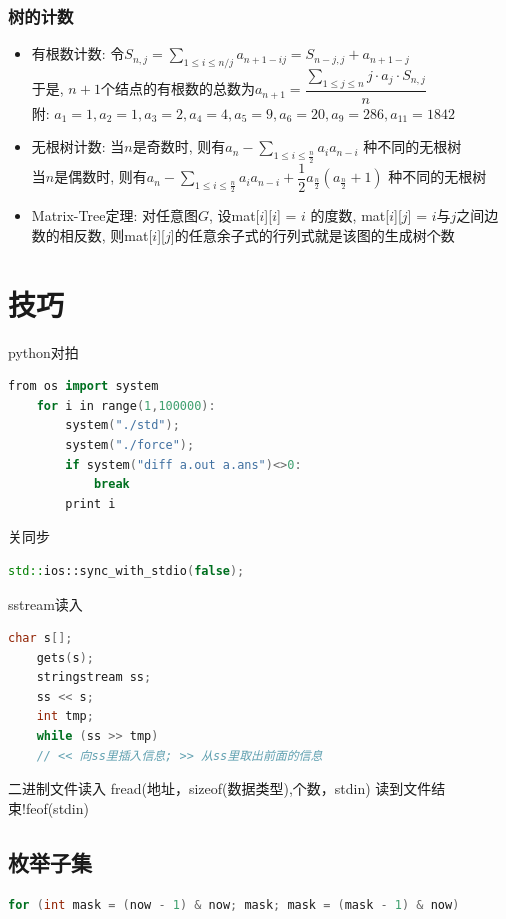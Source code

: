 \documentclass[landscape,a4paper]{article}
\begin{document}
\begin{spacing}{0.3}
\begin{multicols}{2}
\subsubsection{树的计数}
\begin{itemize}
\item 有根数计数: 令$S_{n, j} = \sum\limits_{1 \le i \le n / j} a_{n + 1 - ij} = S_{n - j, j} + a_{n + 1 - j}$\\
  于是, $n + 1$个结点的有根数的总数为$a_{n + 1} = \dfrac{\sum\limits_{1 \le j \le n} j \cdot a_j \cdot S_{n, j} }{n}$\\
  附: $a_1 = 1, a_2 = 1, a_3 = 2, a_4 = 4, a_5 = 9, a_6 = 20, a_9 = 286, a_{11} = 1842$
\item 无根树计数: 当$n$是奇数时, 则有$a_n - \sum\limits_{1 \le i \le \frac{n}{2}} a_i a_{n - i}$ 种不同的无根树\\
  当$n$是偶数时, 则有$a_n - \sum\limits_{1 \le i \le \frac{n}{2}} a_i a_{n - i} + \dfrac{1}{2} a_\frac{n}{2} (a_\frac{n}{2} + 1)$ 种不同的无根树
\item Matrix-Tree定理: 对任意图$G$, 设mat[$i$][$i$] = $i$ 的度数, mat[$i$][$j$] = $i$与$j$之间边数的相反数, 则mat[$i$][$j$]的任意余子式的行列式就是该图的生成树个数
\end{itemize}

\section{技巧}
python对拍
\begin{lstlisting}[language=C++]
from os import system
	for i in range(1,100000):
		system("./std");
		system("./force");
		if system("diff a.out a.ans")<>0:
            break
		print i
\end{lstlisting}

关同步
\begin{lstlisting}[language=C++]
    std::ios::sync_with_stdio(false);
\end{lstlisting}

sstream读入
\begin{lstlisting}[language=C++]
    char s[];
    gets(s);
    stringstream ss;
    ss << s;
    int tmp;
    while (ss >> tmp)
    // << 向ss里插入信息; >> 从ss里取出前面的信息
\end{lstlisting}

二进制文件读入
	fread(地址，sizeof(数据类型),个数，stdin) 读到文件结束!feof(stdin)
\subsection{枚举子集}
\begin{lstlisting}[language=C++]
	for (int mask = (now - 1) & now; mask; mask = (mask - 1) & now)
\end{lstlisting}

\end{multicols}
\end{spacing}
\end{document}
